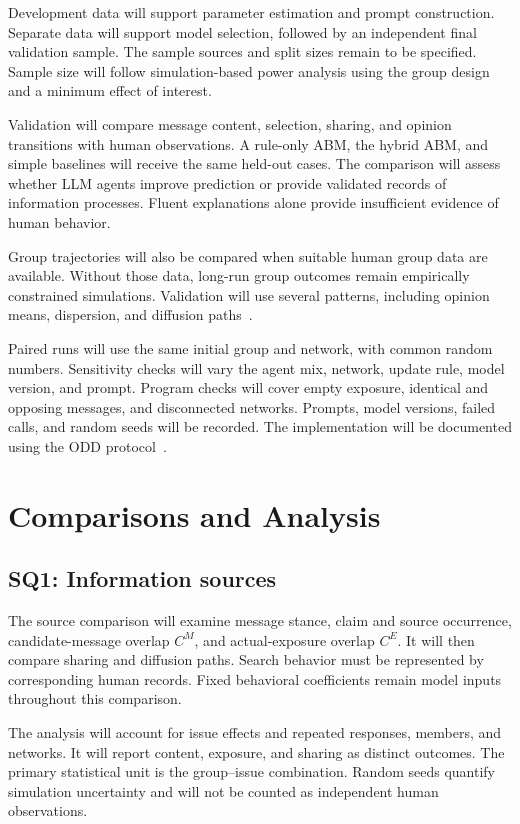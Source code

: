 \documentclass[11pt,a4paper]{article}
\begin{document}
Development data will support parameter estimation and prompt construction. Separate data will support model selection, followed by an independent final validation sample. The sample sources and split sizes remain to be specified. Sample size will follow simulation-based power analysis using the group design and a minimum effect of interest.

Validation will compare message content, selection, sharing, and opinion transitions with human observations. A rule-only ABM, the hybrid ABM, and simple baselines will receive the same held-out cases. The comparison will assess whether LLM agents improve prediction or provide validated records of information processes. Fluent explanations alone provide insufficient evidence of human behavior.

Group trajectories will also be compared when suitable human group data are available. Without those data, long-run group outcomes remain empirically constrained simulations. Validation will use several patterns, including opinion means, dispersion, and diffusion paths~\citep{windrum2007,grimm2005}.

Paired runs will use the same initial group and network, with common random numbers. Sensitivity checks will vary the agent mix, network, update rule, model version, and prompt. Program checks will cover empty exposure, identical and opposing messages, and disconnected networks. Prompts, model versions, failed calls, and random seeds will be recorded. The implementation will be documented using the ODD protocol~\citep{grimm2020}.

\section{Comparisons and Analysis}

\subsection{SQ1: Information sources}

The source comparison will examine message stance, claim and source occurrence, candidate-message overlap $C^M$, and actual-exposure overlap $C^E$. It will then compare sharing and diffusion paths. Search behavior must be represented by corresponding human records. Fixed behavioral coefficients remain model inputs throughout this comparison.

The analysis will account for issue effects and repeated responses, members, and networks. It will report content, exposure, and sharing as distinct outcomes. The primary statistical unit is the group--issue combination. Random seeds quantify simulation uncertainty and will not be counted as independent human observations.
\end{document}
